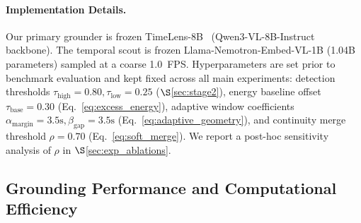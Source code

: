 \paragraph{Implementation Details.} Our primary grounder is frozen TimeLens-8B~\cite{timelens2024} (Qwen3-VL-8B-Instruct backbone). The temporal scout is frozen Llama-Nemotron-Embed-VL-1B (1.04B parameters) sampled at a coarse 1.0~FPS. Hyperparameters are set prior to benchmark evaluation and kept fixed across all main experiments: detection thresholds $\tau_{\text{high}}=0.80, \tau_{\text{low}}=0.25$ ($\S$\ref{sec:stage2}), energy baseline offset $\tau_{\text{base}}=0.30$ (Eq.~\ref{eq:excess_energy}), adaptive window coefficients $\alpha_{\text{margin}}=3.5\text{s}, \beta_{\text{gap}}=3.5\text{s}$ (Eq.~\ref{eq:adaptive_geometry}), and continuity merge threshold $\rho=0.70$ (Eq.~\ref{eq:soft_merge}). We report a post-hoc sensitivity analysis of $\rho$ in $\S$\ref{sec:exp_ablations}.


\subsection{Grounding Performance and Computational Efficiency}
\label{sec:exp_main}

